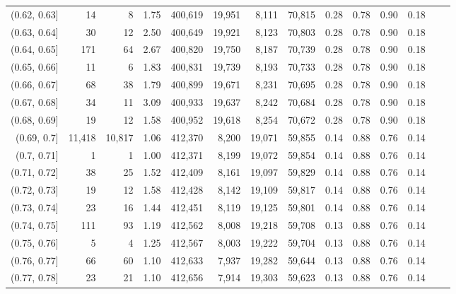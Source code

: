 \begin{tabular}{rrrrrrrrrrrrrr}
(0.62, 0.63]   &      14 &       8 &      1.75 &  400,619 &   19,951 &   8,111 &  70,815 &  0.28 &  0.78 &  0.90 &      0.18 \\
(0.63, 0.64]   &      30 &      12 &      2.50 &  400,649 &   19,921 &   8,123 &  70,803 &  0.28 &  0.78 &  0.90 &      0.18 \\
(0.64, 0.65]   &     171 &      64 &      2.67 &  400,820 &   19,750 &   8,187 &  70,739 &  0.28 &  0.78 &  0.90 &      0.18 \\
(0.65, 0.66]   &      11 &       6 &      1.83 &  400,831 &   19,739 &   8,193 &  70,733 &  0.28 &  0.78 &  0.90 &      0.18 \\
(0.66, 0.67]   &      68 &      38 &      1.79 &  400,899 &   19,671 &   8,231 &  70,695 &  0.28 &  0.78 &  0.90 &      0.18 \\
(0.67, 0.68]   &      34 &      11 &      3.09 &  400,933 &   19,637 &   8,242 &  70,684 &  0.28 &  0.78 &  0.90 &      0.18 \\
(0.68, 0.69]   &      19 &      12 &      1.58 &  400,952 &   19,618 &   8,254 &  70,672 &  0.28 &  0.78 &  0.90 &      0.18 \\
(0.69, 0.7]    &  11,418 &  10,817 &      1.06 &  412,370 &    8,200 &  19,071 &  59,855 &  0.14 &  0.88 &  0.76 &      0.14 \\
(0.7, 0.71]    &       1 &       1 &      1.00 &  412,371 &    8,199 &  19,072 &  59,854 &  0.14 &  0.88 &  0.76 &      0.14 \\
(0.71, 0.72]   &      38 &      25 &      1.52 &  412,409 &    8,161 &  19,097 &  59,829 &  0.14 &  0.88 &  0.76 &      0.14 \\
(0.72, 0.73]   &      19 &      12 &      1.58 &  412,428 &    8,142 &  19,109 &  59,817 &  0.14 &  0.88 &  0.76 &      0.14 \\
(0.73, 0.74]   &      23 &      16 &      1.44 &  412,451 &    8,119 &  19,125 &  59,801 &  0.14 &  0.88 &  0.76 &      0.14 \\
(0.74, 0.75]   &     111 &      93 &      1.19 &  412,562 &    8,008 &  19,218 &  59,708 &  0.13 &  0.88 &  0.76 &      0.14 \\
(0.75, 0.76]   &       5 &       4 &      1.25 &  412,567 &    8,003 &  19,222 &  59,704 &  0.13 &  0.88 &  0.76 &      0.14 \\
(0.76, 0.77]   &      66 &      60 &      1.10 &  412,633 &    7,937 &  19,282 &  59,644 &  0.13 &  0.88 &  0.76 &      0.14 \\
(0.77, 0.78]   &      23 &      21 &      1.10 &  412,656 &    7,914 &  19,303 &  59,623 &  0.13 &  0.88 &  0.76 &      0.14 \\

\end{tabular}
